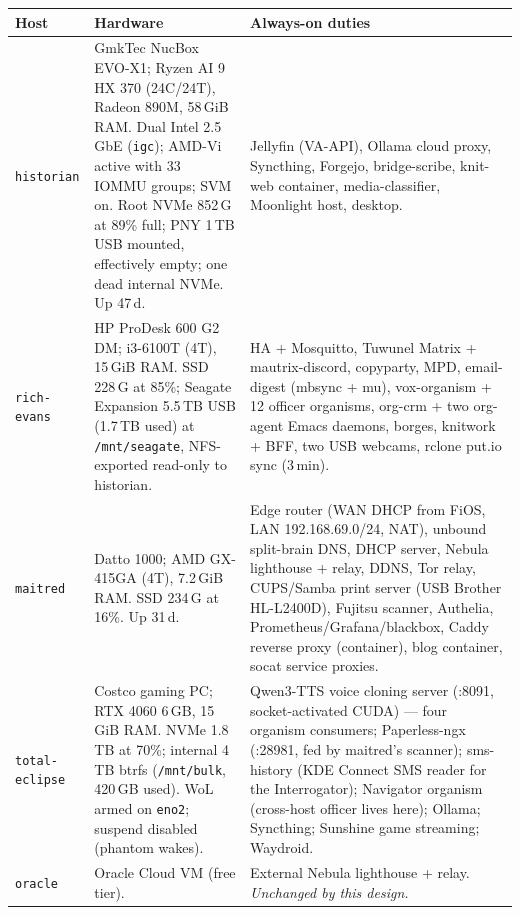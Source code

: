 \documentclass[11pt,letterpaper,headings=small]{scrartcl}
\begin{document}
\begin{center}
\small
\begin{tabular}{@{}lp{2.6in}p{2.9in}@{}}
\toprule
\textbf{Host} & \textbf{Hardware} & \textbf{Always-on duties} \\
\midrule
\texttt{historian} &
GmkTec NucBox EVO-X1; Ryzen AI 9 HX 370 (24C/24T), Radeon 890M,
58\,GiB RAM. Dual Intel 2.5\,GbE (\texttt{igc}); AMD-Vi active with 33
IOMMU groups; SVM on. Root NVMe 852\,G at 89\% full; PNY 1\,TB USB
mounted, effectively empty; one dead internal NVMe. Up 47\,d. &
Jellyfin (VA-API), Ollama cloud proxy, Syncthing, Forgejo,
bridge-scribe, knit-web container, media-classifier, Moonlight host,
desktop. \\
\addlinespace
\texttt{rich-evans} &
HP ProDesk 600 G2 DM; i3-6100T (4T), 15\,GiB RAM. SSD 228\,G at
85\%; Seagate Expansion 5.5\,TB USB (1.7\,TB used) at
\texttt{/mnt/seagate}, NFS-exported read-only to historian. &
HA + Mosquitto, Tuwunel Matrix + mautrix-discord, copyparty, MPD,
email-digest (mbsync + mu), vox-organism + 12 officer organisms,
org-crm + two org-agent Emacs daemons, borges, knitwork + BFF, two USB
webcams, rclone put.io sync (3\,min). \\
\addlinespace
\texttt{maitred} &
Datto 1000; AMD GX-415GA (4T), 7.2\,GiB RAM. SSD 234\,G at 16\%. Up
31\,d. &
Edge router (WAN DHCP from FiOS, LAN 192.168.69.0/24, NAT),
unbound split-brain DNS, DHCP server, Nebula lighthouse + relay,
DDNS, Tor relay, CUPS/Samba print server (USB Brother HL-L2400D),
Fujitsu scanner, Authelia, Prometheus/Grafana/blackbox, Caddy
reverse proxy (container), blog container, socat service proxies. \\
\addlinespace
\texttt{total-eclipse} &
Costco gaming PC; RTX 4060 6\,GB, 15\,GiB RAM. NVMe 1.8\,TB at 70\%;
internal 4\,TB btrfs (\texttt{/mnt/bulk}, 420\,GB used). WoL armed on
\texttt{eno2}; suspend disabled (phantom wakes). &
Qwen3-TTS voice cloning server (:8091, socket-activated CUDA) ---
four organism consumers; Paperless-ngx (:28981, fed by maitred's
scanner); sms-history (KDE Connect SMS reader for the Interrogator);
Navigator organism (cross-host officer lives here); Ollama;
Syncthing; Sunshine game streaming; Waydroid. \\
\addlinespace
\texttt{oracle} &
Oracle Cloud VM (free tier). &
External Nebula lighthouse + relay. \emph{Unchanged by this design.} \\
\bottomrule
\end{tabular}
\end{center}
\end{document}
